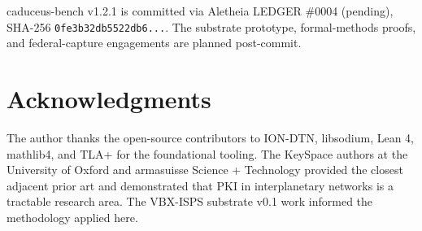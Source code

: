 \documentclass[conference]{IEEEtran}
\begin{document}
caduceus-bench v1.2.1 is committed via Aletheia LEDGER \#0004 (pending), SHA-256 \texttt{0fe3b32db5522db6...}. The substrate prototype, formal-methods proofs, and federal-capture engagements are planned post-commit.

\section*{Acknowledgments}

The author thanks the open-source contributors to ION-DTN, libsodium, Lean 4, mathlib4, and TLA+ for the foundational tooling. The KeySpace authors at the University of Oxford and armasuisse Science + Technology provided the closest adjacent prior art and demonstrated that PKI in interplanetary networks is a tractable research area. The VBX-ISPS substrate v0.1 work informed the methodology applied here.



\end{document}
